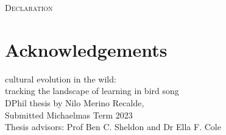 \documentclass[9pt, twocolumn, twoside]{nilosthesis}
\begin{document}


\onecolumn
\normalsize

\pagecolor{white}


\normalsize
\copyrightpage




\normalsize
\onecolumn 

\vspace*{\fill - 1cm}
\begin{flushright}
{\scshape \Large{Declaration}}\\
\end{flushright}

\vspace*{\fill}


\normalsize
\pagecolor{white}


\onecolumn 
\chapter*{Acknowledgements}
\vspace{5pt}


\clearpage{\pagestyle{empty}\cleardoublepage} %
\bgroup
\hypersetup{linkcolor = black}
\tableofcontents
\listoffigures
\egroup

\clearpage{\pagestyle{empty}\cleardoublepage} %
\onecolumn
\vspace*{4cm} %

\begin{flushright}
{\titlefont\Large{cultural evolution in the wild:}}\\
\normalsize
{\titlefont\Large{tracking the landscape of learning in bird song}} \\[.5cm]
DPhil thesis by Nilo Merino Recalde,\\Submitted Michaelmas Term 2023\\
Thesis advisors: Prof Ben C. Sheldon and Dr Ella F. Cole\\
\end{flushright}
\end{document}
